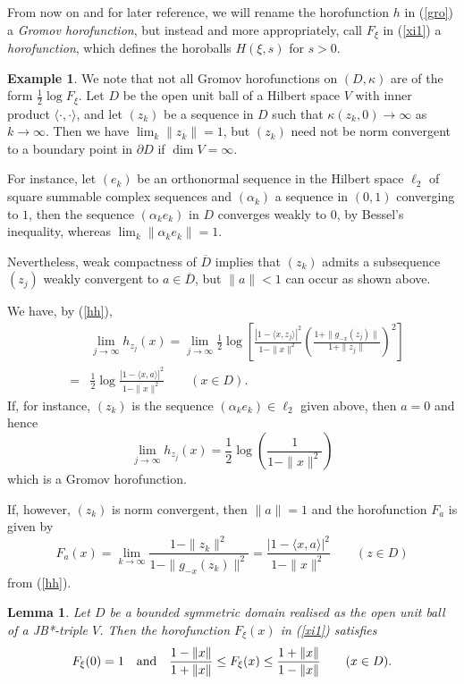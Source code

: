 \documentclass[12pt, twoside]{article}
\newtheorem{lemma}[theorem]{Lemma}
\theoremstyle{definition}
\newtheorem{example}[theorem]{Example}
\numberwithin{equation}{section}
\begin{document}
From now on and for later reference,
we will rename the horofunction $h$ in (\ref{gro}) a {\it Gromov horofunction}, but instead
and more appropriately,
call $F_\xi$ in (\ref{xi1})  a {\it horofunction}, which defines the horoballs $H(\xi, s)$ for $s>0$.

\begin{example}\label{h}
We note that not all Gromov horofunctions on $(D,\kappa)$ are of the form $\frac{1}{2}\log F_\xi$.
Let $D$ be the open unit ball of a Hilbert space $V$ with inner product $\langle\cdot,\cdot\rangle$,
 and let $(z_k)$  be a sequence in $D$ such that $\kappa(z_k,0) \rightarrow \infty$ as $k \rightarrow \infty$.
 Then we have $\lim_k \|z_k\| =1$, but $(z_k)$ need not be norm convergent to a boundary point in $\partial D$
 if $\dim V = \infty$.

For instance, let $(e_k)$ be an orthonormal sequence in the Hilbert space $\ell_2$ of square summable complex sequences and
  $(\alpha_k)$ a sequence in $(0,1)$ converging to $1$, then the sequence $(\alpha_k e_k)$ in $D$ converges weakly to $0$,
  by Bessel's inequality, whereas $\lim_k \|\alpha_k e_k\|=1$.

  Nevertheless,  weak compactness
  of $\overline D$ implies that $(z_k)$ admits a subsequence $(z_j)$ weakly convergent to $a\in \overline D$, but $\|a\| <1$ can occur
as shown above.

We have, by (\ref{hh}),
\begin{eqnarray*}
& &\lim_{j\rightarrow \infty} h_{z_j}(x) =\lim_{j\rightarrow \infty}
 \frac{1}{2}\log \left[ \frac{|1-\langle x, z_j\rangle|^2}{1-\|x\|^2}
 \left(\frac{1+\|g_{-x}(z_j)\|}{1+ \|z_j\|}\right)^2\right]\\
&= & \frac{1}{2}\log  \frac{|1-\langle x, a\rangle|^2}{1-\|x\|^2} \qquad (x\in D).
\end{eqnarray*}
If, for instance, $(z_k)$ is the sequence $(\alpha_ke_k) \in \ell_2$  given above, then $a=0$ and hence
$$ \lim_{j\rightarrow \infty} h_{z_j}(x) = \frac{1}{2}\log  \left(\frac{1}{1-\|x\|^2}\right)$$
which is a Gromov horofunction.

If, however, $(z_k)$ is norm convergent,  then $\|a\|=1$ and the horofunction $F_a$ is given by
$$ F_a(x)= \lim_{k\rightarrow \infty} \frac{1-\|z_k\|^2}{1-\|g_{-x}(z_k)\|^2}=   \frac{|1-\langle x, a\rangle|^2}{1-\|x\|^2}\qquad (z\in D) $$
from (\ref{hh}).
\end{example}


\begin{lemma}\label{b5}
Let $D$ be a bounded symmetric domain realised as the open unit ball of a JB*-triple $V$.
Then the horofunction $F_\xi(x)$ in (\ref{xi1}) satisfies
\begin{equation}\label{bbdd}
F_\xi(0) =1 \quad {\rm and}\quad \frac{1-\|x\|}{1+\|x\|} \leq F_\xi(x) \leq  \frac{1+\|x\|}{1-\|x\|} \qquad (x\in D).
\end{equation}
\end{lemma}
\end{document}
